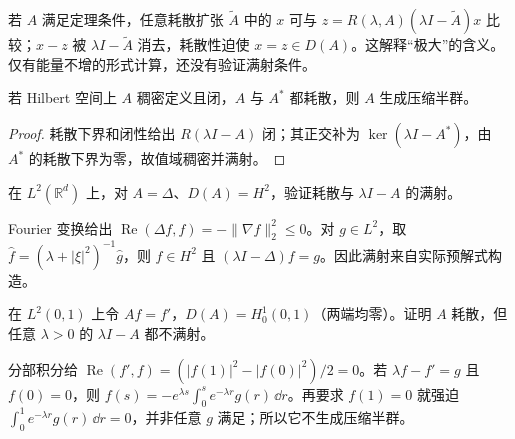 若 $A$ 满足定理条件，任意耗散扩张 $\widetilde A$ 中的 $x$ 可与 $z=R(\lambda,A)(\lambda I-\widetilde A)x$ 比较；$x-z$ 被 $\lambda I-\widetilde A$ 消去，耗散性迫使 $x=z\in D(A)$。这解释“极大”的含义。仅有能量不增的形式计算，还没有验证满射条件。

\begin{corollary}
若 Hilbert 空间上 $A$ 稠密定义且闭，$A$ 与 $A^*$ 都耗散，则 $A$ 生成压缩半群。
\end{corollary}
\begin{proof}
耗散下界和闭性给出 $R(\lambda I-A)$ 闭；其正交补为 $\ker(\lambda I-A^*)$，由 $A^*$ 的耗散下界为零，故值域稠密并满射。
\end{proof}

\begin{exercise}\label{ex:y9-laplacian-dissipative}
在 $L^2(\mathbb R^d)$ 上，对 $A=\Delta$、$D(A)=H^2$，验证耗散与 $\lambda I-A$ 的满射。
\end{exercise}
\begin{solution}
Fourier 变换给出 $\operatorname{Re}(\Delta f,f)=-\|\nabla f\|_2^2\le0$。对 $g\in L^2$，取 $\widehat f=(\lambda+|\xi|^2)^{-1}\widehat g$，则 $f\in H^2$ 且 $(\lambda I-\Delta)f=g$。因此满射来自实际预解式构造。
\end{solution}

\begin{exercise}[耗散仍可缺少边界可解性]\label{ex:y9-dissipative-not-maximal}
在 $L^2(0,1)$ 上令 $Af=f'$，$D(A)=H_0^1(0,1)$（两端均零）。证明 $A$ 耗散，但任意 $\lambda>0$ 的 $\lambda I-A$ 都不满射。
\end{exercise}
\begin{solution}
分部积分给 $\operatorname{Re}(f',f)=(|f(1)|^2-|f(0)|^2)/2=0$。若 $\lambda f-f'=g$ 且 $f(0)=0$，则 $f(s)=-e^{\lambda s}\int_0^se^{-\lambda r}g(r)\,\dd r$。再要求 $f(1)=0$ 就强迫 $\int_0^1e^{-\lambda r}g(r)\,\dd r=0$，并非任意 $g$ 满足；所以它不生成压缩半群。
\end{solution}
